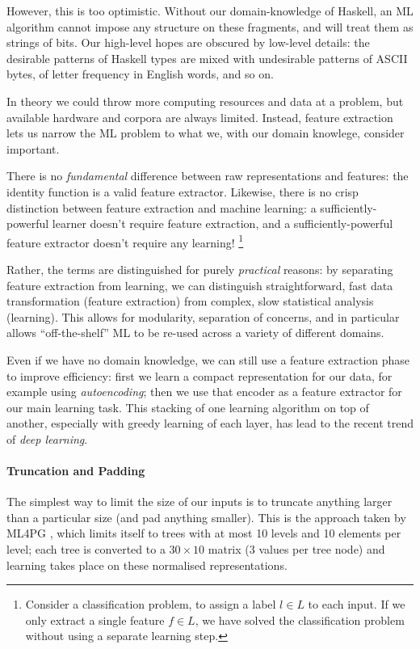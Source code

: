 \documentclass[]{article}
\begin{document}
However, this is too optimistic. Without our domain-knowledge of Haskell, an ML algorithm cannot impose any structure on these fragments, and will treat them as strings of bits. Our high-level hopes are obscured by low-level details: the desirable patterns of Haskell types are mixed with undesirable patterns of ASCII bytes, of letter frequency in English words, and so on.

In theory we could throw more computing resources and data at a problem, but available hardware and corpora are always limited. Instead, feature extraction lets us narrow the ML problem to what we, with our domain knowlege, consider important.

There is no \emph{fundamental} difference between raw representations and features: the identity function is a valid feature extractor. Likewise, there is no crisp distinction between feature extraction and machine learning: a sufficiently-powerful learner doesn't require feature extraction, and a sufficiently-powerful feature extractor doesn't require any learning! \footnote{Consider a classification problem, to assign a label $l \in L$ to each input. If we only extract a single feature $f \in L$, we have solved the classification problem without using a separate learning step.}

Rather, the terms are distinguished for purely \emph{practical} reasons: by separating feature extraction from learning, we can distinguish straightforward, fast data transformation (feature extraction) from complex, slow statistical analysis (learning). This allows for modularity, separation of concerns, and in particular allows ``off-the-shelf'' ML to be re-used across a variety of different domains.

Even if we have no domain knowledge, we can still use a feature extraction phase to improve efficiency: first we learn a compact representation for our data, for example using \emph{autoencoding}; then we use that encoder as a feature extractor for our main learning task. This stacking of one learning algorithm on top of another, especially with greedy learning of each layer, has lead to the recent trend of \emph{deep learning}.

\paragraph{Truncation and Padding}

The simplest way to limit the size of our inputs is to truncate anything larger than a particular size (and pad anything smaller). This is the approach taken by ML4PG \cite{journals/corr/abs-1302-6421}, which limits itself to trees with at most 10 levels and 10 elements per level; each tree is converted to a $30 \times 10$ matrix (3 values per tree node) and learning takes place on these normalised representations.
\end{document}
